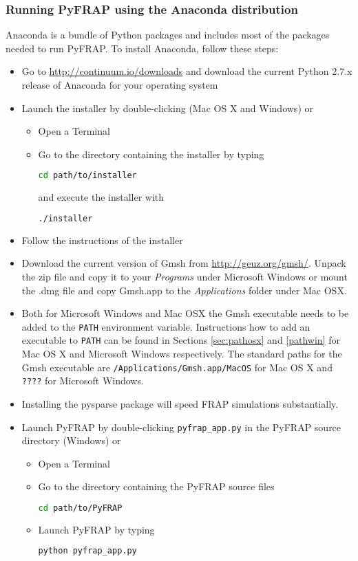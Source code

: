 \documentclass[a4paper,11pt]{article}
\begin{document}
\subsubsection{Running PyFRAP using the Anaconda distribution}
\label{sec:anaconda}

Anaconda is a bundle of Python packages and includes most of the packages needed to run PyFRAP. To install Anaconda, follow these steps:

\begin{itemize}
 \item Go to \href{http://continuum.io/downloads}{http://continuum.io/downloads} and download the current Python 2.7.x release of Anaconda for your operating system 
 \item Launch the installer by double-clicking (Mac OS X and Windows) or 
 \begin{itemize}
 \item Open a Terminal
 \item Go to the directory containing the installer by typing
 \begin{lstlisting}[frame=single,language=bash]  
cd path/to/installer
\end{lstlisting}
and execute the installer with
 \begin{lstlisting}[frame=single,language=bash]  
./installer
\end{lstlisting}
 \end{itemize}
\item Follow the instructions of the installer
\item Download the current version of Gmsh from \url{http://geuz.org/gmsh/}. Unpack the zip file and copy it to your \textit{Programs} under Microsoft Windows or mount the .dmg file 
and copy Gmsh.app to the \textit{Applications} folder under Mac OSX.
\item Both for Microsoft Windows and Mac OSX the Gmsh executable needs to be added to the \verb+PATH+ environment variable. Instructions how to add an executable to \verb+PATH+ can be found in Sections
\ref{sec:pathosx} and \ref{pathwin} for Mac OS X and Microsoft Windows respectively. The standard paths for the Gmsh executable are  \verb+/Applications/Gmsh.app/MacOS+ for Mac OS X and \verb+????+ for Microsoft Windows.
\item Installing the pysparse package will speed FRAP simulations substantially. 

\item Launch PyFRAP by double-clicking \verb+pyfrap_app.py+ in the PyFRAP source directory (Windows) or
\begin{itemize}
 \item Open a Terminal
 \item Go to the directory containing the PyFRAP source files
 \begin{lstlisting}[frame=single,language=bash]  
cd path/to/PyFRAP
\end{lstlisting}
\item Launch PyFRAP by typing
 \begin{lstlisting}[frame=single,language=bash]  
python pyfrap_app.py
\end{lstlisting}
\end{itemize}
\end{itemize}
\end{document}
